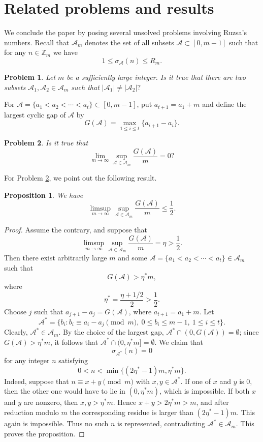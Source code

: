 \documentclass[12pt,a4paper,reqno]{amsart}
\numberwithin{equation}{section}
\theoremstyle{plain}
\newtheorem{problem}{Problem}
\newtheorem{proposition}{Proposition}
\theoremstyle{definition}
\begin{document}
\section{Related problems and results}
We conclude the paper by posing several unsolved problems involving Ruzsa's numbers. Recall that $\mathscr{A}_m$ denotes the set of all subsets $\mathcal{A}\subset [0,m-1]$ such that for any $n\in \mathbb{Z}_m$ we have
$$
1\le \sigma_{\mathcal{A}}(n)\le R_m.
$$


\begin{problem}\label{probl:1}
Let $m$ be a sufficiently large integer. Is it true that there are two subsets $\mathcal{A}_1, \mathcal{A}_2\in \mathscr{A}_m$ such that 
\(
|\mathcal{A}_1|\neq |\mathcal{A}_2|?
\)
\end{problem}

For $\mathcal A=\{a_1<a_2<\cdots<a_t\}\subset [0,m-1]$, put $a_{t+1}=a_1+m$ and define the largest cyclic gap of $\mathcal A$ by
\[
G(\mathcal A)=\max_{1\le i\le t}\{a_{i+1}-a_i\}.
\]

\begin{problem}\label{probl:2}
Is it true that 
\[
\lim_{m\to\infty}\sup_{\mathcal A\in\mathscr A_m}\frac{G(\mathcal A)}{m}=0?
\]
\end{problem}

For Problem \ref{probl:2}, we point out the following result.
\begin{proposition}\label{pro-prob-2}
We have
\[
\limsup_{m\to\infty}\sup_{\mathcal A\in\mathscr A_m}\frac{G(\mathcal A)}{m}\le \frac{1}{2}.
\] 
\end{proposition}
\begin{proof}
Assume the contrary, and suppose that 
\[
\limsup_{m\to\infty}\sup_{\mathcal A\in\mathscr A_m}\frac{G(\mathcal A)}{m}=\eta> \frac{1}{2}.
\]
Then there exist arbitrarily large $m$ and some $\mathcal A=\{a_1<a_2<\cdots<a_t\}\in\mathscr A_m$ such that
\[
G(\mathcal A)>\eta^*m,
\]
where
$$
\eta^*=\frac{\eta+1/2}{2}>\frac{1}{2}.
$$
Choose $j$ such that $a_{j+1}-a_j=G(\mathcal A)$, where $a_{t+1}=a_1+m$. Let 
$$
\mathcal{A}^*=\big\{b_i: b_i\equiv a_i-a_j\pmod{m},\ 0\le b_i\le m-1,\ 1\le i\le t\big\}.
$$
Clearly, $\mathcal{A}^*\in \mathscr{A}_m$. By the choice of the largest gap, $\mathcal{A}^*\cap(0,G(\mathcal A))=\emptyset$; since $G(\mathcal A)>\eta^*m$, it follows that $\mathcal{A}^*\cap(0,\eta^*m]=\emptyset$. We claim that
\[
\sigma_{\mathcal A^*}(n)=0
\]
for any integer $n$ satisfying
\[
0<n<\min\big\{(2\eta^*-1)m,\eta^*m\big\}.
\]
Indeed, suppose that $n\equiv x+y\pmod m$ with $x,y\in\mathcal A^*$. If one of $x$ and $y$ is $0$, then the other one would have to lie in $(0,\eta^*m)$, which is impossible. If both $x$ and $y$ are nonzero, then $x,y>\eta^*m$. Hence $x+y>2\eta^*m>m$, and after reduction modulo $m$ the corresponding residue is larger than $(2\eta^*-1)m$. This again is impossible. Thus no such $n$ is represented, contradicting $\mathcal A^*\in\mathscr A_m$. This proves the proposition.
\end{proof}
\end{document}
